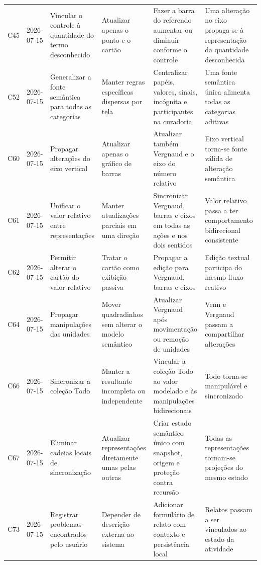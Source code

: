 \begin{landscape}
\begin{longtable}{p{1.0cm}p{1.9cm}p{4.0cm}p{5.0cm}p{6.2cm}p{5.7cm}}
\addlinespace[2pt]
C45 & 2026-07-15 & Vincular o controle à quantidade do termo desconhecido & Atualizar apenas o ponto e o cartão & Fazer a barra do referendo aumentar ou diminuir conforme o controle & Uma alteração no eixo propaga-se à representação da quantidade desconhecida \\
\addlinespace[2pt]
C52 & 2026-07-15 & Generalizar a fonte semântica para todas as categorias & Manter regras específicas dispersas por tela & Centralizar papéis, valores, sinais, incógnita e participantes na curadoria & Uma fonte semântica única alimenta todas as categorias aditivas \\
\addlinespace[2pt]
C60 & 2026-07-15 & Propagar alterações do eixo vertical & Atualizar apenas o gráfico de barras & Atualizar também Vergnaud e o eixo do número relativo & Eixo vertical torna-se fonte válida de alteração semântica \\
\addlinespace[2pt]
C61 & 2026-07-15 & Unificar o valor relativo entre representações & Manter atualizações parciais em uma direção & Sincronizar Vergnaud, barras e eixos em todas as ações e nos dois sentidos & Valor relativo passa a ter comportamento bidirecional consistente \\
\addlinespace[2pt]
C62 & 2026-07-15 & Permitir alterar o cartão do valor relativo & Tratar o cartão como exibição passiva & Propagar a edição para Vergnaud, barras e eixos & Edição textual participa do mesmo fluxo reativo \\
\addlinespace[2pt]
C64 & 2026-07-15 & Propagar manipulações das unidades & Mover quadradinhos sem alterar o modelo semântico & Atualizar Vergnaud após movimentação ou remoção de unidades & Venn e Vergnaud passam a compartilhar alterações \\
\addlinespace[2pt]
C66 & 2026-07-15 & Sincronizar a coleção Todo & Manter a resultante incompleta ou independente & Vincular a coleção Todo ao valor modelado e às manipulações bidirecionais & Todo torna-se manipulável e sincronizado \\
\addlinespace[2pt]
C67 & 2026-07-15 & Eliminar cadeias locais de sincronização & Atualizar representações diretamente umas pelas outras & Criar estado semântico único com snapshot, origem e proteção contra recursão & Todas as representações tornam-se projeções do mesmo estado \\
\addlinespace[2pt]
C73 & 2026-07-15 & Registrar problemas encontrados pelo usuário & Depender de descrição externa ao sistema & Adicionar formulário de relato com contexto e persistência local & Relatos passam a ser vinculados ao estado da atividade \\

\end{longtable}
\end{landscape}
